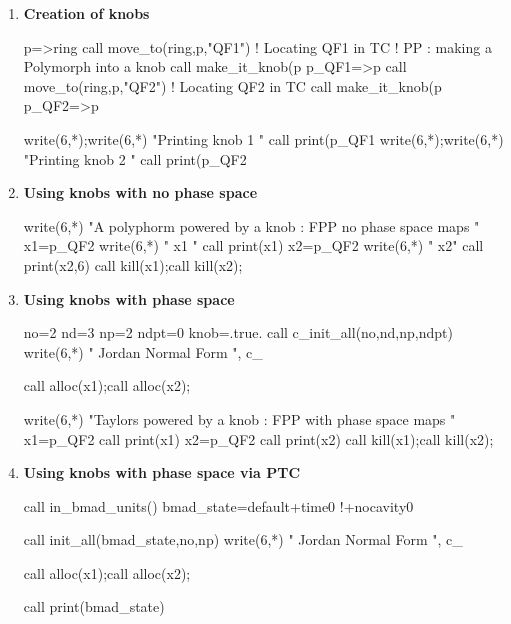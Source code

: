\documentclass{hitec}     %
\begin{document}
{{ 
 
 \begin{enumerate}
 \item\label{itc1} {\bf Creation of knobs}
 
  \begin{code}
p=>ring%
call move_to(ring,p,"QF1")   !  Locating QF1 in TC
!  PP : making a Polymorph into a knob
call make_it_knob(p%
p_QF1=>p
call move_to(ring,p,"QF2")   ! Locating QF2 in TC
call make_it_knob(p%
p_QF2=>p

write(6,*);write(6,*) "Printing knob 1  "
call print(p_QF1%
write(6,*);write(6,*) "Printing knob 2  "
call print(p_QF2%
  \end{code}
  
 \item\label{itc2} {\bf Using knobs with no phase space}
 
  \begin{code}
write(6,*) "A polyphorm powered by a knob : FPP no phase space maps "
x1=p_QF2%
write(6,*) " x1 "
call print(x1)
x2=p_QF2%
write(6,*) " x2"
call print(x2,6)
call kill(x1);call kill(x2);
  \end{code}
  
 \item\label{itc3} {\bf Using knobs with phase space}
 
  \begin{code}

no=2
nd=3
np=2
ndpt=0
knob=.true. 
call c_init_all(no,nd,np,ndpt)
write(6,*) " Jordan Normal Form ", c_%

call alloc(x1);call alloc(x2);

 

write(6,*) "Taylors powered by a knob : FPP with phase space maps "
x1=p_QF2%
call print(x1)
x2=p_QF2%
call print(x2)
call kill(x1);call kill(x2);
  \end{code}
  
 \item\label{itc4} {\bf Using knobs with phase space via PTC}
 
  \begin{code}
call in_bmad_units()
bmad_state=default+time0      !+nocavity0

call init_all(bmad_state,no,np)
write(6,*) " Jordan Normal Form ", c_%


call alloc(x1);call alloc(x2);

call print(bmad_state)
 


\end{code}
\end{enumerate}}}
\end{document}

